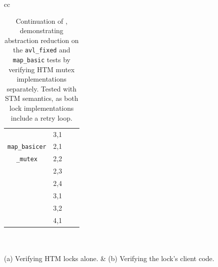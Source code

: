 \begin{table}[hb!]
\begin{center}
\begin{tabular}{cc}
\begin{tabular}{cc||r|r}
			& 3,1 & \ETAdag{173d 17h} & \ETAdag{12572187} \\
			\cline{1-4}
			{\tt map\_basicer}
			& 2,1 & \cpu{14.34} & \ints{9} \\
			{\tt \_mutex}
			& 2,2 & \cpu{147.27} & \ints{2953} \\
			& 2,3 & \cpu{12946.21} & \ints{244691} \\
			& 2,4 & \ETAdag{2d 17h} & \ETAdag{1130184} \\
			& 3,1 & \cpu{637.81} & \ints{12707} \\
			& 3,2 & \ETAdag{102d 13h} & \ETAdag{13220616} \\
			& 4,1 & \ETAdag{33h 33m} & \ETAdag{1778661} \\
		\end{tabular}
		\\
		\\
		(a) Verifying HTM locks alone.
		&
		(b) Verifying the lock's client code.
		\end{tabular}
	\end{center}
	\caption[Continuation of , demonstrating abstraction reduction.]
		{Continuation of ,
		demonstrating abstraction reduction %
		on the {\tt avl\_fixed} and {\tt map\_basic} tests
		by verifying HTM mutex implementations separately.
		Tested with STM semantics, as both lock implementations include a retry loop.
		\\
		}
	\label{tab:tm-verifs2}
\end{table}

